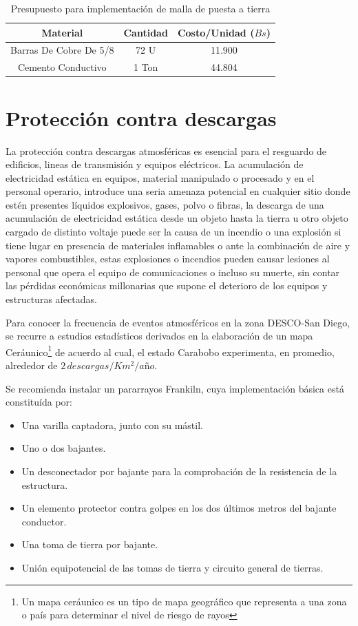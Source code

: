\documentclass[11pt, a4paper, twosides]{report}
\begin{document}
\begin{table}[h]
    \centering
    \begin{tabular}{|c|c|c|}
        \hline
        \cellcolor{gray75} \textbf{Material} & \cellcolor{gray75} \textbf{Cantidad} & \cellcolor{gray75} \textbf{Costo/Unidad ($ Bs $)} \\ \hline
        Barras De Cobre De 5/8 & 72 U & 11.900 \\ \hline
        Cemento Conductivo & 1 Ton & 44.804 \\ \hline
    \end{tabular}
    \caption{Presupuesto para implementación de malla de puesta a tierra}
    \end{table}

\section{Protección contra descargas}
 La protección contra descargas atmosféricas es esencial para el resguardo de edificios, lineas de transmisión y equipos eléctricos\cite{howell82}. La acumulación de electricidad estática  en equipos, material manipulado o procesado y en el personal operario, introduce una seria amenaza potencial en cualquier sitio donde estén presentes líquidos explosivos, gases, polvo o fibras, la descarga de una acumulación de electricidad estática desde un objeto hasta la tierra u otro objeto cargado de distinto voltaje puede ser la causa de un incendio o una explosión si tiene lugar en presencia de materiales inflamables o ante la combinación de aire y vapores combustibles, estas explosiones o incendios pueden causar lesiones al personal que opera el equipo de comunicaciones o incluso su muerte, sin contar las pérdidas económicas millonarias que supone el deterioro de los equipos y estructuras afectadas.
 
  Para conocer la frecuencia de eventos atmosféricos en la zona DESCO-San Diego, se recurre a estudios estadísticos  derivados en la elaboración de un mapa Ceráunico\footnote{Un mapa ceráunico es un tipo de mapa geográfico que representa a una zona o país para determinar el nivel de riesgo de rayos} de acuerdo al cual, el estado Carabobo experimenta, en promedio, alrededor de $2 \, descargas/Km^{2}/año$. 
  
  Se recomienda instalar un pararrayos Frankiln, cuya implementación básica  está constituída por:

\begin{itemize}
    \item Una varilla captadora, junto con su mástil.
    \item Uno o dos bajantes.
    \item Un desconectador por bajante para la comprobación de la resistencia de la estructura.
    \item Un elemento protector contra golpes en los dos últimos metros del bajante conductor.
    \item Una toma de tierra por bajante.
    \item Unión equipotencial de las tomas de tierra y circuito general de tierras.
\end{itemize}
\end{document}
